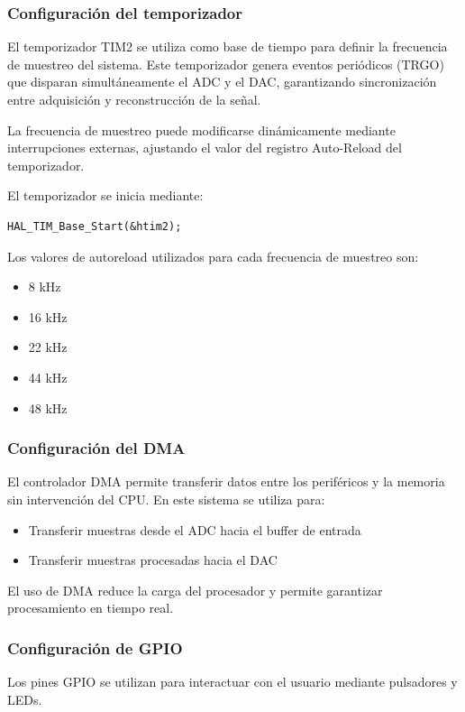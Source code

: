 \documentclass[12pt]{article}
\begin{document}
	\subsubsection{Configuración del temporizador}
	El temporizador TIM2 se utiliza como base de tiempo para definir la frecuencia de muestreo del sistema. Este temporizador genera eventos periódicos (TRGO) que disparan simultáneamente el ADC y el DAC, garantizando sincronización entre adquisición y reconstrucción de la señal.

	La frecuencia de muestreo puede modificarse dinámicamente mediante interrupciones externas, ajustando el valor del registro Auto-Reload del temporizador.

	El temporizador se inicia mediante:

	\begin{lstlisting}[style=mystyle]
	HAL_TIM_Base_Start(&htim2);
	\end{lstlisting}

	Los valores de autoreload utilizados para cada frecuencia de muestreo son:

	\begin{itemize}
	\item 8 kHz
	\item 16 kHz
	\item 22 kHz
	\item 44 kHz
	\item 48 kHz
	\end{itemize}

	\subsubsection{Configuración del DMA}
	El controlador DMA permite transferir datos entre los periféricos y la memoria sin intervención del CPU. En este sistema se utiliza para:

	\begin{itemize}
	\item Transferir muestras desde el ADC hacia el buffer de entrada
	\item Transferir muestras procesadas hacia el DAC
	\end{itemize}

	El uso de DMA reduce la carga del procesador y permite garantizar procesamiento en tiempo real.

	\subsubsection{Configuración de GPIO}
	Los pines GPIO se utilizan para interactuar con el usuario mediante pulsadores y LEDs.
\end{document}
